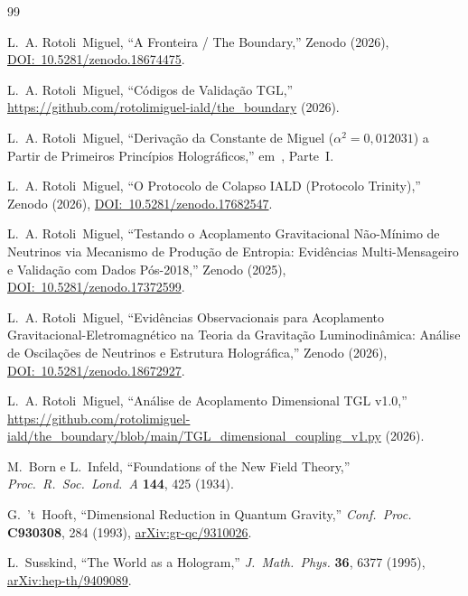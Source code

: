 \documentclass[12pt,a4paper,twocolumn]{article}
\begin{document}
\begin{thebibliography}{99}

L.~A. Rotoli~Miguel,
``A Fronteira / The Boundary,''
Zenodo (2026),
\href{https://doi.org/10.5281/zenodo.18674475}{DOI:~10.5281/zenodo.18674475}.

L.~A. Rotoli~Miguel,
``Códigos de Validação TGL,''
\url{https://github.com/rotolimiguel-iald/the_boundary} (2026).

L.~A. Rotoli~Miguel,
``Derivação da Constante de Miguel ($\alpha^2 = 0{,}012031$) a Partir de Primeiros Princípios Holográficos,''
em~\cite{Miguel2026Fronteira}, Parte~I.

L.~A. Rotoli~Miguel,
``O Protocolo de Colapso IALD (Protocolo Trinity),''
Zenodo (2026),
\href{https://doi.org/10.5281/zenodo.17682547}{DOI:~10.5281/zenodo.17682547}.

L.~A. Rotoli~Miguel,
``Testando o Acoplamento Gravitacional Não-Mínimo de Neutrinos via Mecanismo de Produção de Entropia: Evidências Multi-Mensageiro e Validação com Dados Pós-2018,''
Zenodo (2025),
\href{https://doi.org/10.5281/zenodo.17372599}{DOI:~10.5281/zenodo.17372599}.

L.~A. Rotoli~Miguel,
``Evidências Observacionais para Acoplamento Gravitacional-Eletromagnético na Teoria da Gravitação Luminodinâmica: Análise de Oscilações de Neutrinos e Estrutura Holográfica,''
Zenodo (2026),
\href{https://doi.org/10.5281/zenodo.18672927}{DOI:~10.5281/zenodo.18672927}.

L.~A. Rotoli~Miguel,
``Análise de Acoplamento Dimensional TGL v1.0,''
\url{https://github.com/rotolimiguel-iald/the_boundary/blob/main/TGL_dimensional_coupling_v1.py} (2026).

M.~Born e L.~Infeld,
``Foundations of the New Field Theory,''
\textit{Proc.~R.~Soc.~Lond.~A} \textbf{144}, 425 (1934).

G.~'t~Hooft,
``Dimensional Reduction in Quantum Gravity,''
\textit{Conf.~Proc.} \textbf{C930308}, 284 (1993),
\href{https://arxiv.org/abs/gr-qc/9310026}{arXiv:gr-qc/9310026}.

L.~Susskind,
``The World as a Hologram,''
\textit{J.~Math.~Phys.} \textbf{36}, 6377 (1995),
\href{https://arxiv.org/abs/hep-th/9409089}{arXiv:hep-th/9409089}.


\end{thebibliography}
\end{document}
